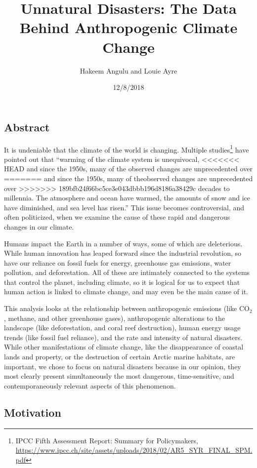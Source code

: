 \documentclass[10pt,]{article}
\title{Unnatural Disasters: The Data Behind Anthropogenic Climate Change}
\author{Hakeem Angulu and Louie Ayre}
\date{12/8/2018}
\let\rmarkdownfootnote\footnote%
\def\footnote{\protect\rmarkdownfootnote}
\begin{document}
\maketitle

\subsection{Abstract}\label{abstract}

It is undeniable that the climate of the world is changing. Multiple
studies\footnote{IPCC Fifth Assessment Report: Summary for Policymakers,
  \url{https://www.ipcc.ch/site/assets/uploads/2018/02/AR5_SYR_FINAL_SPM.pdf}}
have pointed out that ``warming of the climate system is unequivocal,
<<<<<<< HEAD
and since the 1950s, many of the observed changes are unprecedented over
=======
and since the 1950s, many of theobserved changes are unprecedented over
>>>>>>> 189bfb24f66bc5ce3e043dbbb196d8186a38429c
decades to millennia. The atmosphere and ocean have warmed, the amounts
of snow and ice have diminished, and sea level has risen.'' This issue
becomes controversial, and often politicized, when we examine the cause
of these rapid and dangerous changes in our climate.

Humans impact the Earth in a number of ways, some of which are
deleterious. While human innovation has leaped forward since the
industrial revolution, so have our reliance on fossil fuels for energy,
greenhouse gas emissions, water pollution, and deforestation. All of
these are intimately connected to the systems that control the planet,
including climate, so it is logical for us to expect that human action
is linked to climate change, and may even be the main cause of it.

This analysis looks at the relationship between anthropogenic emissions
(like CO\(_2\), methane, and other greenhouse gases), anthropogenic
alterations to the landscape (like deforestation, and coral reef
destruction), human energy usage trends (like fossil fuel reliance), and
the rate and intensity of natural disasters. While other manifestations
of climate change, like the disappearance of coastal lands and property,
or the destruction of certain Arctic marine habitats, are important, we
chose to focus on natural disasters because in our opinion, they most
clearly present simultaneously the most dangerous, time-sensitive, and
contemporaneously relevant aspects of this phenomenon.

\subsection{Motivation}\label{motivation}
\end{document}
